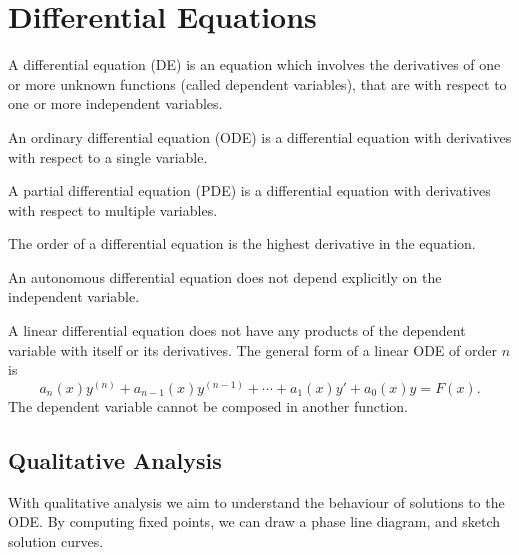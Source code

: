 \documentclass{article}
\begin{document}
\section{Differential Equations}
\begin{definition}
    A differential equation (DE) is an equation which involves the derivatives of
    one or more unknown functions (called dependent variables), that are with respect
    to one or more independent variables.
\end{definition}
\begin{definition}
    An ordinary differential equation (ODE) is a differential equation with
    derivatives with respect to a single variable.
\end{definition}
\begin{definition}
    A partial differential equation (PDE) is a differential equation with
    derivatives with respect to multiple variables.
\end{definition}
\begin{definition}
    The order of a differential equation is the highest derivative in the equation.
\end{definition}
\begin{definition}
    An autonomous differential equation does not depend explicitly on the independent variable.
\end{definition}
\begin{definition}
    A linear differential equation does not have any products of the dependent variable with itself
    or its derivatives. The general form of a linear ODE of order \(n\) is
    \begin{equation*}
        a_n(x)y^{\left( n \right)} + a_{n-1}(x)y^{\left( n-1 \right)} + \cdots + a_1(x)y' + a_0(x)y = F(x).
    \end{equation*}
    The dependent variable cannot be composed in another function.
\end{definition}
\subsection{Qualitative Analysis}
With qualitative analysis we aim to understand the behaviour of solutions to the ODE\@.
By \linebreak computing fixed points, we can draw a phase line diagram, and sketch solution curves.
\end{document}
